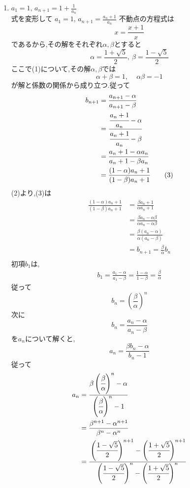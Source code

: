 \documentclass[dvipdfmx,a4paper,11pt,fleqn,openany]{jsbook}
\begin{document}
\begin{enumerate}[label=(\arabic*),parsep=3pt]
        \item $\displaystyle a_1=1,\, a_{n+1}=1+\frac{1}{a_n}$\\
              式を変形して
              $\displaystyle a_1=1,\, a_{n+1}=\frac{a_n+1}{a_n}$
              不動点の方程式は
              \[
                x=\frac{x+1}{x}\tag{1}
              \]
              であるから,その解をそれぞれ$\alpha,\beta$とすると
              \[
                \alpha=\frac{1+\sqrt{5}}{2},\ \beta=\frac{1-\sqrt{5}}{2}
              \]
              ここで(1)について,その解$\alpha,\beta$では
              \[
                \alpha+\beta=1,\, \quad \alpha\beta=-1\tag{2}
              \]
              が解と係数の関係から成り立つ.従って
              \begin{align*}
                b_{n+1}&=\frac{a_{n+1}-\alpha}{a_{n+1}-\beta}\\
                &=\cfrac{\cfrac{a_n+1}{a_n}-\alpha}{\cfrac{a_n+1}{a_n}-\beta}\\
                &=\frac{a_n+1-\alpha a_n}{a_n+1-\beta a_n}\\
                &=\frac{(1-\alpha)a_n+1}{(1-\beta)a_n+1}\tag{3}
              \end{align*}
              (2)より,(3)は
              \begin{align*}
                \frac{(1-\alpha)a_n+1}{(1-\beta)a_n+1}&=\frac{\beta a_n+1}{\alpha a_n+1}\\
                &=\frac{\beta a_n-\alpha\beta}{\alpha a_n-\alpha\beta}\\
                &=\frac{\beta (a_n-\alpha)}{\alpha (a_n-\beta)}\\
                &=b_{n+1}=\frac{\beta}{\alpha}b_n\\
              \end{align*}
              初項$b_1$は,
              \begin{align*}
                b_1=\frac{a_1-\alpha}{a_1-\beta}=\frac{1-\alpha}{1-\beta}=\frac{\beta}{\alpha}
              \end{align*}
              従って
              \[
                b_n=\left(\frac{\beta}{\alpha}\right)^n
              \]
              次に
              \[
                b_{n}=\frac{a_{n}-\alpha}{a_{n}-\beta}
              \]
              を$a_n$について解くと,
              \[
                a_{n}=\frac{\beta b_{n}-\alpha}{b_{n}-1}
              \]
              従って
              \begin{align*}
                a_{n}&=\cfrac{\beta \left(\cfrac{\beta}{\alpha}\right)^n-\alpha}{\left(\cfrac{\beta}{\alpha}\right)^n-1}  \\
                &=\frac{\beta^{n+1}-\alpha^{n+1}}{\beta^n-\alpha^n}\\
                &=\cfrac{\left(\cfrac{1-\sqrt{5}}{2}\right)^{n+1}-\left(\cfrac{1+\sqrt{5}}{2}\right)^{n+1}}{\left(\cfrac{1-\sqrt{5}}{2}\right)^n-\left(\cfrac{1+\sqrt{5}}{2}\right)^n}
              \end{align*}        
      \end{enumerate}
\end{document}

